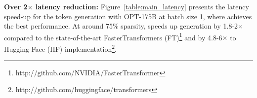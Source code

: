 \textbf{Over 2$\times$ latency reduction: } 
Figure~\ref{table:main_latency} presents the latency speed-up for the token generation with OPT-175B at batch size 1, where \name{} achieves the best performance. At around 75\% sparsity, \name{} speeds up generation by 1.8-2$\times$ compared to the state-of-the-art FasterTransformers (FT)\footnote{http://github.com/NVIDIA/FasterTransformer} and by 4.8-6$\times$ to Hugging Face (HF) implementation\footnote{http://github.com/huggingface/transformers}. 








\vspace{-2mm}
